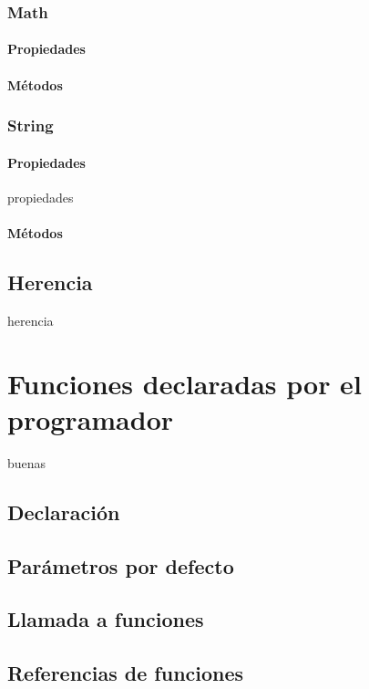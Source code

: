\documentclass[12pt]{report}
\begin{document}
			\subsubsection{Math}
				\paragraph{Propiedades} %
				\paragraph{Métodos}
			\subsubsection{String}
				\paragraph{Propiedades} %
					propiedades
				\paragraph{Métodos}
		\subsection{Herencia}
			herencia
	\section{Funciones declaradas por el programador}
		buenas
		\subsection{Declaración}
		\subsection{Parámetros por defecto}
		\subsection{Llamada a funciones}
		\subsection{Referencias de funciones}
\end{document}
